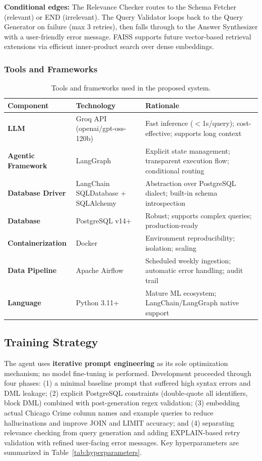 \documentclass{article}
\begin{document}
\noindent\textbf{Conditional edges:} The Relevance Checker routes to the Schema Fetcher (relevant) or END (irrelevant). The Query Validator loops back to the Query Generator on failure (max 3 retries), then falls through to the Answer Synthesizer with a user-friendly error message. FAISS \cite{johnson2017faiss} supports future vector-based retrieval extensions via efficient inner-product search over dense embeddings.

\subsubsection{Tools and Frameworks}
\begin{table}[h]
\centering
\begin{tabularx}{\textwidth}{|l|X|X|}
\hline
\textbf{Component} & \textbf{Technology} & \textbf{Rationale} \\
\hline
\textbf{LLM} & Groq API (openai/gpt-oss-120b) & Fast inference ($<$1s/query); cost-effective; supports long context \\
\hline
\textbf{Agentic Framework} & LangGraph & Explicit state management; transparent execution flow; conditional routing \\
\hline
\textbf{Database Driver} & LangChain SQLDatabase + SQLAlchemy & Abstraction over PostgreSQL dialect; built-in schema introspection \\
\hline
\textbf{Database} & PostgreSQL v14+ & Robust; supports complex queries; production-ready \\
\hline
\textbf{Containerization} & Docker & Environment reproducibility; isolation; scaling \\
\hline
\textbf{Data Pipeline} & Apache Airflow & Scheduled weekly ingestion; automatic error handling; audit trail \\
\hline
\textbf{Language} & Python 3.11+ & Mature ML ecosystem; LangChain/LangGraph native support \\
\hline
\end{tabularx}
\caption{Tools and frameworks used in the proposed system.}
\label{tab:tools_frameworks}
\end{table}

\subsection{Training Strategy}

The agent uses \textbf{iterative prompt engineering} as its sole optimization mechanism; no model fine-tuning is performed. Development proceeded through four phases: (1) a minimal baseline prompt that suffered high syntax errors and DML leakage; (2) explicit PostgreSQL constraints (double-quote all identifiers, block DML) combined with post-generation regex validation; (3) embedding actual Chicago Crime column names and example queries to reduce hallucinations and improve JOIN and LIMIT accuracy; and (4) separating relevance checking from query generation and adding EXPLAIN-based retry validation with refined user-facing error messages. Key hyperparameters are summarized in Table~\ref{tab:hyperparameters}.
\end{document}
